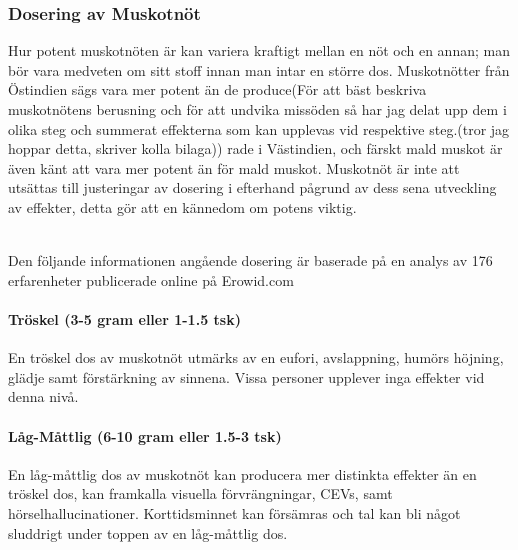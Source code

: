 





\subsubsection{Dosering av Muskotnöt}
Hur potent muskotnöten är kan variera kraftigt mellan en nöt och en annan;
man bör vara medveten om sitt stoff innan man intar en större dos.
Muskotnötter från Östindien sägs vara mer potent än de produce(För att bäst beskriva muskotnötens berusning och för att undvika missöden så har jag delat upp dem i olika steg och summerat effekterna som kan upplevas vid respektive steg.(tror jag hoppar detta, skriver kolla bilaga))
rade i Västindien, och färskt
mald muskot är även känt att vara mer potent än för mald muskot.\cite{entheogenreview}
Muskotnöt är inte att utsättas till justeringar av dosering i efterhand pågrund
av dess sena utveckling av effekter, detta gör att en kännedom om potens viktig.
\cite{entheogenreview}

\\

Den följande informationen angående dosering är baserade på en analys av 176 erfarenheter publicerade online på Erowid.com

\paragraph{Tröskel (3-5 gram eller 1-1.5 tsk)}
En tröskel dos av muskotnöt utmärks av en eufori, avslappning, humörs höjning, glädje samt
förstärkning av sinnena.
Vissa personer upplever inga effekter vid denna nivå.

\paragraph{Låg-Måttlig (6-10 gram eller 1.5-3 tsk)}
En låg-måttlig dos av muskotnöt kan producera mer distinkta effekter än en tröskel dos, kan framkalla visuella förvrängningar, CEVs, samt hörselhallucinationer.
Korttidsminnet kan försämras och tal kan bli något sluddrigt under toppen av en
låg-måttlig dos.

